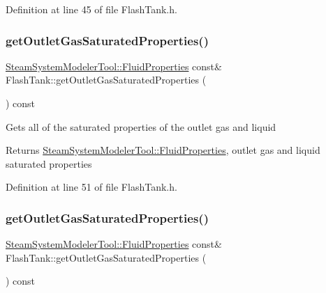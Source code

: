 Definition at line 45 of file Flash\+Tank.\+h.

\mbox{\label{class_flash_tank_a9db00130ed4419e2e251c9e5ce936572}} 
\subsubsection{\texorpdfstring{get\+Outlet\+Gas\+Saturated\+Properties()}{getOutletGasSaturatedProperties()}\hspace{0.1cm}{\footnotesize\ttfamily [1/3]}}
{\footnotesize\ttfamily \hyperlink{struct_steam_system_modeler_tool_1_1_fluid_properties}{Steam\+System\+Modeler\+Tool\+::\+Fluid\+Properties} const\& Flash\+Tank\+::get\+Outlet\+Gas\+Saturated\+Properties (\begin{DoxyParamCaption}{ }\end{DoxyParamCaption}) const\hspace{0.3cm}{\ttfamily [inline]}}

Gets all of the saturated properties of the outlet gas and liquid \begin{DoxyReturn}{Returns}
\hyperlink{struct_steam_system_modeler_tool_1_1_fluid_properties}{Steam\+System\+Modeler\+Tool\+::\+Fluid\+Properties}, outlet gas and liquid saturated properties 
\end{DoxyReturn}


Definition at line 51 of file Flash\+Tank.\+h.

\mbox{\label{class_flash_tank_a9db00130ed4419e2e251c9e5ce936572}} 
\subsubsection{\texorpdfstring{get\+Outlet\+Gas\+Saturated\+Properties()}{getOutletGasSaturatedProperties()}\hspace{0.1cm}{\footnotesize\ttfamily [2/3]}}
{\footnotesize\ttfamily \hyperlink{struct_steam_system_modeler_tool_1_1_fluid_properties}{Steam\+System\+Modeler\+Tool\+::\+Fluid\+Properties} const\& Flash\+Tank\+::get\+Outlet\+Gas\+Saturated\+Properties (\begin{DoxyParamCaption}{ }\end{DoxyParamCaption}) const\hspace{0.3cm}{\ttfamily [inline]}}

